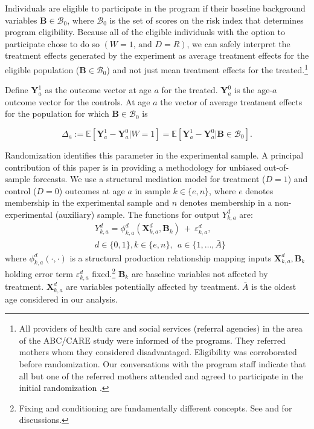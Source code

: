 Individuals are eligible to participate in the program if their baseline background variables $\bm{B}\in\mathcal{B}_0$, where $\mathcal{B}_0$ is the set of scores on the risk index that determines program eligibility. Because all of the eligible individuals with the option to participate chose to do so $(W=1\text{, and } D=R)$, we can safely interpret the treatment effects generated by the experiment as average treatment effects for the eligible population ($\bm{B}\in\mathcal{B}_0$) and not just mean treatment effects for the treated.\footnote{All providers of health care and social services (referral agencies) in the area of the ABC/CARE study were informed of the programs. They referred mothers whom they considered disadvantaged. Eligibility was corroborated before randomization. Our conversations with the program staff indicate that all but one of the referred mothers attended and agreed to participate in the initial randomization \citep{Ramey-etal_2012-ABC}.}

Define $\bm{Y}^1_a$ as the outcome vector at age $a$ for the treated. $\bm{Y}^0_a$ is the age-$a$ outcome vector for the controls. At age $a$ the vector of average treatment effects for the population for which $\bm{B}\in\mathcal{B}_0$ is

\begin{equation}
\Delta_a  := \mathbb{E} \left[ \bm{Y}^1_a - \bm{Y}^0_a | W = 1 \right] = \mathbb{E} \left[\bm{Y}^1_a - \bm{Y}^0_{a} | \bm{B} \in \mathcal{B}_0 \right]. \label{eq:mainte}
\end{equation}

Randomization identifies this parameter in the experimental sample. A principal contribution of this paper is in providing a methodology for unbiased out-of-sample forecasts. We use a structural mediation model for treatment ($D=1$) and control ($D=0$) outcomes at age $a$ in sample $k \in \{e,n\}$, where $e$ denotes membership in the experimental sample and $n$ denotes membership in a non-experimental (auxiliary) sample. The functions for output $Y^d_{k,a}$ are:
\begin{eqnarray}
&Y^d_{k,a} = \phi^d_{k,a} (\bm{X}^d_{k,a}, \bm{B}_k) \ + \ \varepsilon^d_{k,a},  \label{eq:outcome} \\
 &d \in\{0,1\},  k\in\{e,n\}, \ \ a\in\{1,\dots,\bar{A}\} \nonumber
\end{eqnarray}
where $\phi^d_{k,a}\left( \cdot, \cdot \right)$ is a structural production relationship mapping inputs $\bm{X}^d_{k,a}, \bm{B}_k$ holding error term $\varepsilon^d_{k,a}$ fixed.\footnote{Fixing and conditioning are fundamentally different concepts. See \cite{Haavelmo_1943_Econometrica} and \citet{Heckman_Pinto_2015_EconometTheory} for discussions.} $ \bm{B}_k$ are baseline variables not affected by treatment. $\bm{X}^d_{k,a}$ are variables potentially affected by treatment. $\bar{A}$ is the oldest age considered in our analysis.

